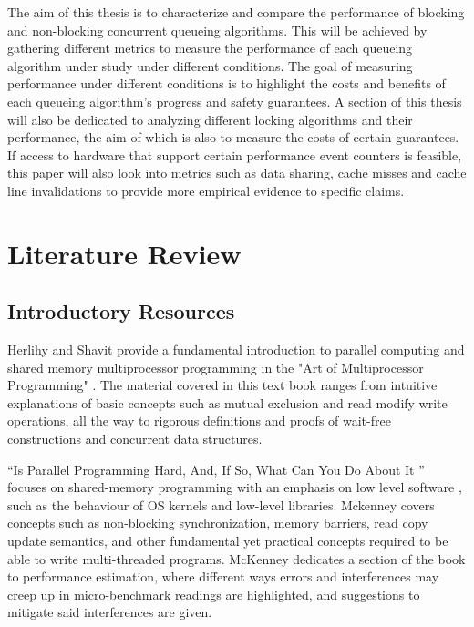 \documentclass[a4paper, 12pt, titlepage]{article}
\begin{document}
\begin{onehalfspacing}
The aim of this thesis is to characterize and compare the performance of blocking \cite{anderson1990performance, herlihy2020art,graunke1990synchronization} and non-blocking \cite{herlihy2020art,valois1995lock} concurrent queueing algorithms. This will be achieved by gathering different metrics to measure the performance of each queueing algorithm under study under different conditions. The goal of measuring performance under different conditions is to highlight the costs and benefits of each queueing algorithm's progress and safety guarantees. A section of this thesis will also be dedicated to analyzing different locking algorithms and their performance, the aim of which is also to measure the costs of certain guarantees. If access to hardware that support certain performance event counters is feasible, this paper will also look into metrics such as data sharing, cache misses and cache line invalidations\cite{intelmanual,intelmanualoptimization,sahelices2009methodology} to provide more empirical evidence to specific claims.

\section{Literature Review}
\subsection{Introductory Resources}
Herlihy and Shavit provide a fundamental introduction to parallel computing and shared memory multiprocessor programming in the "Art of Multiprocessor Programming" \cite{herlihy2020art}. The material covered in this text book ranges from intuitive explanations of basic concepts such as mutual exclusion and read modify write operations, all the way to rigorous definitions and proofs of wait-free constructions and concurrent data structures.

``Is Parallel Programming Hard, And, If So, What Can You Do About It '' focuses on shared-memory programming with an emphasis on low level software \cite{mckenney2017parallel}, such as the behaviour of OS kernels and low-level libraries. Mckenney covers concepts such as non-blocking synchronization, memory barriers, read copy update semantics, and other fundamental yet practical concepts required to be able to write multi-threaded programs. McKenney dedicates a section of the book to performance estimation, where different ways errors and interferences may creep up in micro-benchmark readings are highlighted, and suggestions to mitigate said interferences are given.

\end{onehalfspacing}
\end{document}
